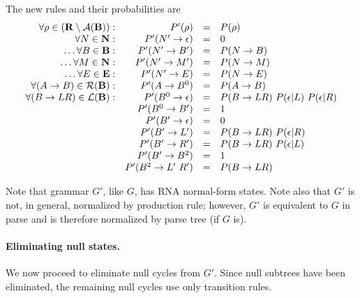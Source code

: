 \documentclass[10pt]{article}
\begin{document}
The new rules and their probabilities are
\[
\begin{array}{rrcl}
\forall \rho \in ({\bf R} \setminus {\cal A}({\bf B})): & P'(\rho)             & = & P(\rho) \\
                                \forall N \in {\bf N}: & P'(N' \to \epsilon)  & = & 0  \\
                          \ldots \forall B \in {\bf B}: & P'(N' \to B')        & = & P(N \to B) \\
                         \ldots \forall M \in {\bf N}: & P'(N' \to M')        & = & P(N \to M) \\
                         \ldots \forall E \in {\bf E}: & P'(N' \to E)         & = & P(N \to E) \\
               \forall (A \to B) \in {\cal R}({\bf B}): & P'(A \to B^0)        & = & P(A \to B) \\
              \forall (B \to LR) \in {\cal L}({\bf B}): & P'(B^0 \to \epsilon) & = & P(B \to LR)\ P(\epsilon | L)\ P(\epsilon | R) \\
                                                       & P'(B^0 \to B')       & = & 1 \\
                                                       & P'(B' \to \epsilon)  & = & 0 \\
                                                       & P'(B' \to L')        & = & P(B \to LR)\ P(\epsilon | R) \\
                                                       & P'(B' \to R')        & = & P(B \to LR)\ P(\epsilon | L) \\
                                                       & P'(B' \to B^2)       & = & 1 \\
                                                       & P'(B^2 \to L'\ R')   & = & P(B \to LR) \\
\end{array}
\]

Note that grammar $G'$, like $G$, has RNA normal-form states.
Note also that $G'$ is not, in general, normalized by production rule;
however, $G'$ is equivalent to $G$ in parse and is therefore normalized by parse tree (if $G$ is).

\paragraph{Eliminating null states.}

We now proceed to eliminate null cycles from $G'$.
Since null subtrees have been eliminated, the remaining null cycles use only transition rules.
\end{document}
